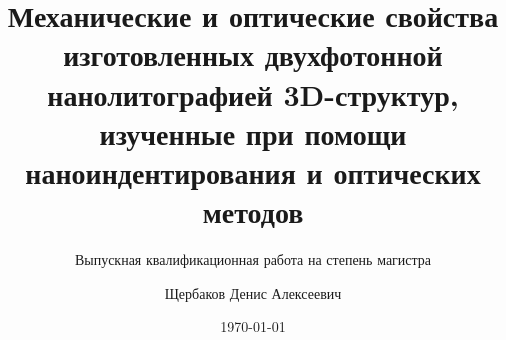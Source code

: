\documentclass[aspectratio=169]{beamer}
\title[MIPT LaTeX]{Механические и оптические свойства изготовленных двухфотонной нанолитографией 3D-структур, изученные при помощи наноиндентирования и оптических методов}
\author[Щербаков Д.А.]{Щербаков Денис Алексеевич}
\institute[МФТИ]{Московский физико-технический институт}
\subtitle[]{Выпускная квалификационная работа на степень магистра}
\date{\today}
\begin{document}

\begin{frame}[plain]
    \titlepage
\end{frame}










\end{document}

